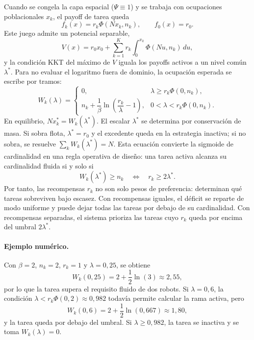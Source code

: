 Cuando se congela la capa espacial ($\Psi\equiv1$) y se trabaja con ocupaciones
poblacionales $x_k$, el payoff de tarea queda
\begin{equation}
  f_k(x)=r_k\Phi(Nx_k,n_k), \qquad f_0(x)=r_0 .
  \label{eq:payoff_base_fluido}
\end{equation}
Este juego admite un potencial separable,
\begin{equation}
  V(x)=r_0x_0+\sum_{k=1}^K r_k\int_0^{x_k}\Phi(Nu,n_k)\,du,
  \label{eq:potencial_water}
\end{equation}
y la condición KKT del máximo de $V$ iguala los payoffs activos a un nivel común
$\lambda^*$. Para no evaluar el logaritmo fuera de dominio, la ocupación esperada se
escribe por tramos:
\begin{equation}
  W_k(\lambda)=
  \begin{cases}
  0,
  & \lambda\ge r_k\Phi(0,n_k),\\[4pt]
  n_k+\dfrac{1}{\beta}
    \ln\!\left(\dfrac{r_k}{\lambda}-1\right),
  & 0<\lambda<r_k\Phi(0,n_k).
  \end{cases}
  \label{eq:water_filling}
\end{equation}
En equilibrio, $Nx_k^*=W_k(\lambda^*)$.
El escalar $\lambda^*$ se determina por conservación de masa. Si sobra flota,
$\lambda^*=r_0$ y el excedente queda en la estrategia inactiva; si no sobra, se
resuelve $\sum_k W_k(\lambda^*)=N$. Esta ecuación convierte la sigmoide de cardinalidad en una
regla operativa de diseño: una tarea activa alcanza su cardinalidad fluida si y solo si
\begin{equation}
  W_k(\lambda^*)\ge n_k
  \quad\Longleftrightarrow\quad
  r_k \ge 2\lambda^* .
  \label{eq:criterio_factibilidad_water}
\end{equation}
Por tanto, las recompensas $r_k$ no son solo pesos de preferencia: determinan qué
tareas sobreviven bajo escasez. Con recompensas iguales, el déficit se reparte de modo
uniforme y puede dejar todas las tareas por debajo de su cardinalidad. Con recompensas
separadas, el sistema prioriza las tareas cuyo $r_k$ queda por encima del umbral
$2\lambda^*$.

\paragraph{Ejemplo numérico.}
Con $\beta=2$, $n_k=2$, $r_k=1$ y $\lambda=0{,}25$, se obtiene
\[
  W_k(0{,}25)=2+\frac{1}{2}\ln(3)\approx 2{,}55,
\]
por lo que la tarea supera el requisito fluido de dos robots. Si $\lambda=0{,}6$, la
condición $\lambda<r_k\Phi(0,2)\approx0{,}982$ todavía permite calcular la rama activa,
pero
\[
  W_k(0{,}6)=2+\frac{1}{2}\ln(0{,}667)\approx1{,}80,
\]
y la tarea queda por debajo del umbral. Si $\lambda\ge0{,}982$, la tarea se inactiva y
se toma $W_k(\lambda)=0$.

